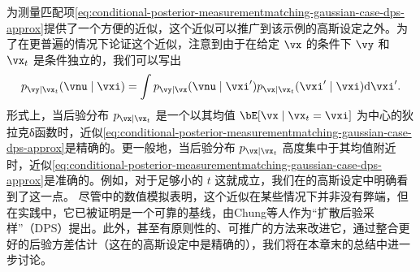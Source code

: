 \documentclass[../../book-main.tex]{subfiles}
\begin{document}
为测量匹配项\eqref{eq:conditional-posterior-measurementmatching-gaussian-case-dps-approx}提供了一个方便的近似，这个近似可以推广到该示例的高斯设定之外。为了在更普遍的情况下论证这个近似，注意到由于在给定 $\vx$ 的条件下 $\vy$ 和 $\vx_t$ 是条件独立的，我们可以写出
\begin{equation}
  p_{\vy \mid \vx_t}(\vnu \mid \vxi)
  =
  \int p_{\vy \mid \vx}(\vnu \mid \vxi') p_{\vx \mid \vx_t}(\vxi' \mid \vxi)
  \odif  \vxi'.
\end{equation}
形式上，当后验分布 $p_{\vx\mid \vx_t}$ 是一个以其均值 $\bE[\vx \mid \vx_t=\vxi]$ 为中心的狄拉克δ函数时，近似\eqref{eq:conditional-posterior-measurementmatching-gaussian-case-dps-approx}是精确的。更一般地，当后验分布 $p_{\vx \mid \vx_t}$ 高度集中于其均值附近时，近似\eqref{eq:conditional-posterior-measurementmatching-gaussian-case-dps-approx}是准确的。例如，对于足够小的 $t$ 这就成立，我们在的高斯设定中明确看到了这一点。
尽管中的数值模拟表明，这个近似在某些情况下并非没有弊端，但在实践中，它已被证明是一个可靠的基线，由Chung等人作为“扩散后验采样”（DPS）提出\cite{chung2023diffusion}。此外，甚至有原则性的、可推广的方法来改进它，通过整合更好的后验方差估计（这在的高斯设定中是精确的），我们将在本章末的总结中进一步讨论。
\end{document}
